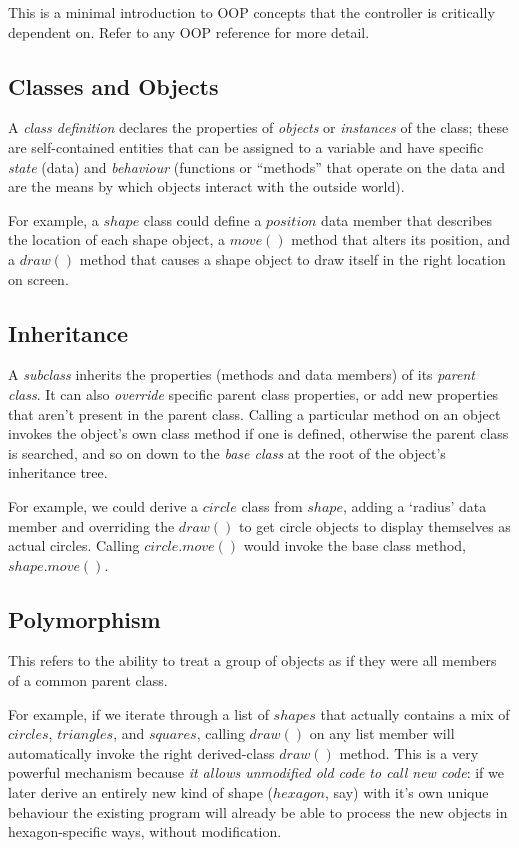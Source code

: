 \documentclass[12pt]{amsart}
\begin{document}
This is a minimal introduction to OOP concepts that the controller is
critically dependent on. Refer to any OOP reference for more detail.

\subsection{Classes and Objects}

A {\em class definition} declares the properties of {\em objects} or
{\em instances} of the class; these are self-contained entities that can
be assigned to a variable and have specific {\em state} (data) and {\em
behaviour} (functions or ``methods'' that operate on the data and are
the means by which objects interact with the outside world).    

For example, a $shape$ class could define a $position$ data member that
describes the location of each shape object, a $move()$ method that
alters its position, and a $draw()$ method that causes a shape object to
draw itself in the right location on screen.

\subsection{Inheritance}

A {\em subclass} inherits the properties (methods and data members)
of its {\em parent class}. It can also {\em override} specific parent
class properties, or add new properties that aren't present in the
parent class. Calling a particular method on an object invokes the
object's own class method if one is defined, otherwise the parent class
is searched, and so on down to the {\em base class} at the root of the
object's inheritance tree. 

For example, we could derive a $circle$ class from $shape$, adding a
`radius' data member and overriding the $draw()$ to get circle objects
to display themselves as actual circles.  Calling $circle.move()$ would
invoke the base class method, $shape.move()$. 


\subsection{Polymorphism}

This refers to the ability to treat a group of objects as if they were
all members of a common parent class.

For example, if we iterate through a list of $shapes$ that actually
contains a mix of $circles$, $triangles$, and $squares$, calling
$draw()$ on any list member will automatically invoke the right
derived-class $draw()$ method.  This is a very powerful mechanism
because {\em it allows unmodified old code to call new code}: if we
later derive an entirely new kind of shape ($hexagon$, say) with it's
own unique behaviour the existing program will already be able to
process the new objects in hexagon-specific ways, without modification. 
\end{document}
